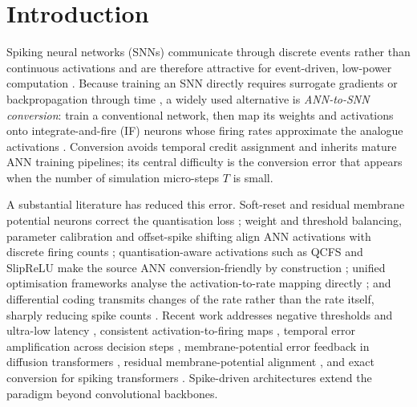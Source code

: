 \documentclass[preprint,12pt]{elsarticle}
\begin{document}
\section{Introduction}
\label{sec:intro}

Spiking neural networks (SNNs) communicate through discrete events rather than continuous activations and are therefore attractive for event-driven, low-power computation \cite{maass1997,akopyan2015truenorth,davies2018loihi}. Because training an SNN directly requires surrogate gradients or backpropagation through time \cite{wu2018stbp,neftci2019surrogate,fang2023spikingjelly}, a widely used alternative is \emph{ANN-to-SNN conversion}: train a conventional network, then map its weights and activations onto integrate-and-fire (IF) neurons whose firing rates approximate the analogue activations \cite{cao2015spiking,diehl2015,rueckauer2017,sengupta2019going}. Conversion avoids temporal credit assignment and inherits mature ANN training pipelines; its central difficulty is the conversion error that appears when the number of simulation micro-steps $T$ is small.

A substantial literature has reduced this error. Soft-reset and residual membrane potential neurons correct the quantisation loss \cite{han2020rmp}; weight and threshold balancing, parameter calibration and offset-spike shifting align ANN activations with discrete firing counts \cite{diehl2015,li2021freelunch,li2022snncap,cos2023offset}; quantisation-aware activations such as QCFS and SlipReLU make the source ANN conversion-friendly by construction \cite{bu2022qcfs,jiang2024universal}; unified optimisation frameworks analyse the activation-to-rate mapping directly \cite{deng2021optimal,jiang2024universal}; and differential coding transmits changes of the rate rather than the rate itself, sharply reducing spike counts \cite{huang2025dcgs}. Recent work addresses negative thresholds and ultra-low latency \cite{xia2026neuro}, consistent activation-to-firing maps \cite{li2024casc}, temporal error amplification across decision steps \cite{xu2026crpi}, membrane-potential error feedback in diffusion transformers \cite{fang2026mpef}, residual membrane-potential alignment \cite{chen2026rmpa}, and exact conversion for spiking transformers \cite{li2024onespike}. Spike-driven architectures \cite{zhou2023spikformer,che2023autospikformer,yao2023spikedriven,fang2021sew} extend the paradigm beyond convolutional backbones.
\end{document}
